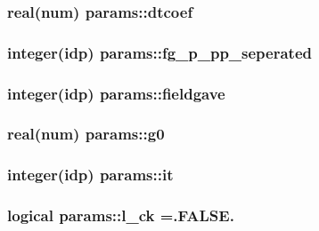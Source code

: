 \subsubsection[{\texorpdfstring{dtcoef}{dtcoef}}]{\setlength{\rightskip}{0pt plus 5cm}real(num) params\+::dtcoef}\hypertarget{namespaceparams_a565cff6b9c99bcab68c1ae3af5f03d9e}{}\label{namespaceparams_a565cff6b9c99bcab68c1ae3af5f03d9e}
\subsubsection[{\texorpdfstring{fg\+\_\+p\+\_\+pp\+\_\+seperated}{fg_p_pp_seperated}}]{\setlength{\rightskip}{0pt plus 5cm}integer(idp) params\+::fg\+\_\+p\+\_\+pp\+\_\+seperated}\hypertarget{namespaceparams_a58efb719fdc3fbbfa8c6beb237ce2716}{}\label{namespaceparams_a58efb719fdc3fbbfa8c6beb237ce2716}
\subsubsection[{\texorpdfstring{fieldgave}{fieldgave}}]{\setlength{\rightskip}{0pt plus 5cm}integer(idp) params\+::fieldgave}\hypertarget{namespaceparams_afd98a17f8dde6a4f7d4e7b0efb7384ea}{}\label{namespaceparams_afd98a17f8dde6a4f7d4e7b0efb7384ea}
\subsubsection[{\texorpdfstring{g0}{g0}}]{\setlength{\rightskip}{0pt plus 5cm}real(num) params\+::g0}\hypertarget{namespaceparams_af27554c70c98a90a2d5fbd7a4083f366}{}\label{namespaceparams_af27554c70c98a90a2d5fbd7a4083f366}
\subsubsection[{\texorpdfstring{it}{it}}]{\setlength{\rightskip}{0pt plus 5cm}integer(idp) params\+::it}\hypertarget{namespaceparams_aa53b49f79463d25c9fe7a51e6b990067}{}\label{namespaceparams_aa53b49f79463d25c9fe7a51e6b990067}
\subsubsection[{\texorpdfstring{l\+\_\+ck}{l_ck}}]{\setlength{\rightskip}{0pt plus 5cm}logical params\+::l\+\_\+ck =.F\+A\+L\+S\+E.}\hypertarget{namespaceparams_a7e70ec0bfba23188ddeb3004e464a69b}{}\label{namespaceparams_a7e70ec0bfba23188ddeb3004e464a69b}
